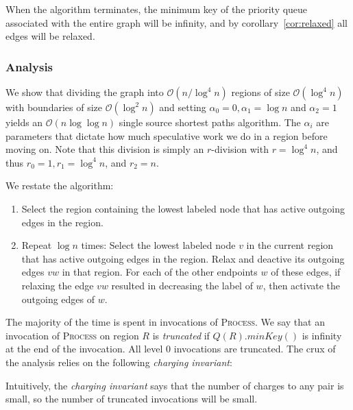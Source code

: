 \documentclass[11pt]{article}
\begin{document}
When the algorithm terminates, the minimum key of the priority queue associated with the entire graph will be infinity, and by corollary~\ref{cor:relaxed} all edges will be relaxed.

\subsubsection{Analysis}
\label{sec:analysis}

We show that dividing the graph into $\mathcal{O}(n/\log^4n)$ regions of size $\mathcal{O}(\log^4 n)$ with boundaries of size $\mathcal{O}(\log^2 n)$ and setting $\alpha_0 = 0, \alpha_1 = \log n$ and $\alpha_2 = 1$ yields an $\mathcal{O}(n \log \log n)$ single source shortest paths algorithm. The $\alpha_i$ are parameters that dictate how much speculative work we do in a region before moving on. Note that this division is simply an $r$-division with $r=\log^4 n$, and thus $r_0=1, r_1 = \log^4 n$, and $r_2 = n$.

We restate the algorithm:
\begin{enumerate}
\item Select the region containing the lowest labeled node that has active outgoing edges in the region.
\item Repeat $\log n$ times: Select the lowest labeled node $v$ in the current region that has active outgoing edges in the region. Relax and deactive its outgoing edges $vw$ in that region. For each of the other endpoints $w$ of these edges, if relaxing the edge $vw$ resulted in decreasing the label of $w$, then activate the outgoing edges of $w$.
\end{enumerate}

The majority of the time is spent in invocations of \textsc{Process}. We say that an invocation of \textsc{Process} on region $R$ is \emph{truncated} if $Q(R).minKey()$ is infinity at the end of the invocation. All level $0$ invocations are truncated. The crux of the analysis relies on the following \emph{charging invariant}:

\noindent{}

Intuitively, the \emph{charging invariant} says that the number of charges to any pair is small, so the number of truncated invocations will be small.
\end{document}
